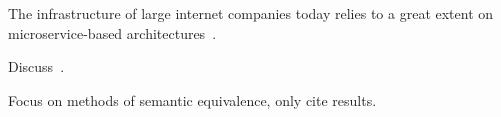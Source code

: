 The infrastructure of large internet companies today relies to a great extent on microservice-based architectures~\cite{}.

Discuss~\cite{ertel_cc18}.

Focus on methods of semantic equivalence, only cite results.
